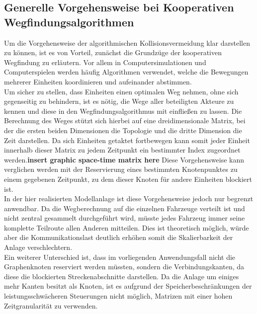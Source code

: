 	\subsection{Generelle Vorgehensweise bei Kooperativen Wegfindungsalgorithmen}
		\label{Coop Pathfinding}
		Um die Vorgehensweise der algorithmischen Kollisionsvermeidung klar darstellen zu können, ist es von Vorteil, zunächst die Grundzüge der kooperativen Wegfindung zu erläutern. Vor allem in Computersimulationen und Computerspielen werden häufig Algorithmen verwendet, welche die Bewegungen mehrerer Einheiten koordinieren und aufeinander abstimmen. 
		\\
		Um sicher zu stellen, dass Einheiten einen optimalen Weg nehmen, ohne sich gegenseitig zu behindern, ist es nötig, die Wege aller beteiligten Akteure zu kennen und diese in den Wegfindungsalgorithmus mit einfließen zu lassen. Die Berechnung des Weges stützt sich hierbei auf eine dreidimensionale Matrix, bei der die ersten beiden Dimensionen die Topologie und die dritte Dimension die Zeit darstellen. Da sich Einheiten getaktet fortbewegen kann somit jeder Einheit innerhalb dieser Matrix zu jedem Zeitpunkt ein bestimmter Index zugeordnet werden\cite{Silver2005}.\textbf{insert graphic space-time matrix here} Diese Vorgehensweise kann verglichen werden mit der Reservierung eines bestimmten Knotenpunktes zu einem gegebenen Zeitpunkt, zu dem dieser Knoten für andere Einheiten blockiert ist\cite{Erdmann1986}.
		\\
		In der hier realisierten Modellanlage ist diese Vorgehensweise jedoch nur begrenzt anwendbar. Da die Wegberechnung auf die einzelnen Fahrzeuge verteilt ist und nicht zentral gesammelt durchgeführt wird, müsste jedes Fahrzeug immer seine komplette Teilroute allen Anderen mitteilen. Dies ist theoretisch möglich, würde aber die Kommunikationslast deutlich erhöhen somit die Skalierbarkeit der Anlage verschlechtern.
		\\
		Ein weiterer Unterschied ist, dass im vorliegenden Anwendungsfall nicht die Graphenknoten reserviert werden müssten, sondern die Verbindungskanten, da diese die blockierten Streckenabschnitte darstellen. Da die Anlage um einiges mehr Kanten besitzt als Knoten, ist es aufgrund der Speicherbeschränkungen der leistungsschwächeren Steuerungen nicht möglich, Matrizen mit einer hohen Zeitgranularität zu verwenden.

